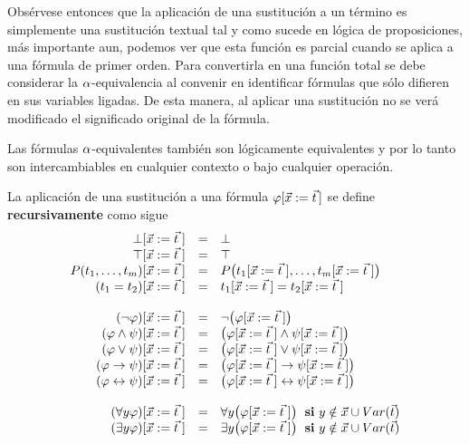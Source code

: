 \documentclass[11pt,letterpaper]{article}
\begin{document}
Obsérvese entonces que la aplicación de una sustitución a un término es
simplemente una sustitución textual tal y como sucede en lógica de 
proposiciones, m\'as importante aun, podemos ver que esta funci\'on es parcial cuando se aplica a una f\'ormula de primer orden.
Para convertirla en una funci\'on total se debe considerar la 
$\al$-equivalencia al convenir en identificar fórmulas que sólo difieren en sus
variables ligadas.
De esta manera, al aplicar una sustituci\'on no se ver\'a modificado el significado original de la f\'ormula.

\noindent Las fórmulas $\al$-equivalentes también son lógicamente equivalentes y por lo tanto son intercambiables en cualquier contexto o bajo cualquier operación.


La aplicación de una sustitución a una fórmula $\vp[\vx:=\vt\,]$ se define  
\textbf{recursivamente} como sigue
\[
 \ba{rll}
  \bot[\vx:=\vt\;] & = & \bot \\
  \top[\vx:=\vt\;] & = & \top \\
  P(t_1,\ldots,t_m)[\vx:=\vt\;] & = &
    P\big(t_1[\vx:=\vt\;], \ldots, t_m[\vx:=\vt\;]\big) \\ 
  (t_1 = t_2)[\vx:=\vt\;] & = & t_1[\vx:=\vt\;]=t_2[\vx:=\vt\;]\\ \\
  (\neg \vp)[\vx:=\vt\;] & = & \neg \big(\vp[\vx:=\vt\;]\big)\\
  (\vp\land\psi)[\vx:=\vt\;] & = &
  \big(\vp[\vx:=\vt\;]\land\psi[\vx:=\vt\;]\big)\\
  (\vp\lor\psi)[\vx:=\vt\;] & = &
  \big(\vp[\vx:=\vt\;]\lor\psi[\vx:=\vt\;]\big)\\
  (\vp\imp\psi)[\vx:=\vt\;] & = &
  \big(\vp[\vx:=\vt\;]\imp\psi[\vx:=\vt\;]\big)\\
  (\vp\iff\psi)[\vx:=\vt\;] & = &
  \big(\vp[\vx:=\vt\;]\iff\psi[\vx:=\vt\;]\big)\\ \\
  (\fa y\vp)[\vx:=\vt\;] & = & \fa y\big(\vp[\vx:=\vt\;]\big)\; 
\text{ \textbf{si} } y\notin
  \vx\cup Var(\vt) \\
(\ex y\vp)[\vx:=\vt\;] & = & \ex y\big(\vp[\vx:=\vt\;]\big)\; \text{ 
\textbf{si} } y\notin  \vx\cup Var(\vt) \\
\ea
\]
\end{document}

